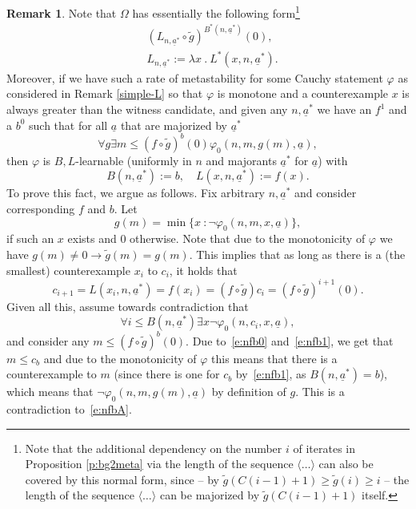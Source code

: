 \documentclass[1p]{elsarticle}
\newcommand{\be}[1][{e:\arabic{equation}}] { \begin{equation}\label{#1} }
\newcommand{\ee} { \end{equation} }
\newcommand{\tup}{\underline} %
\theoremstyle{plain}
\theoremstyle{definition}
\newtheorem{rmk}[thm]{Remark}
\theoremstyle{remark}
\renewcommand{\phi}{\varphi}
\theoremstyle{definition}
\begin{document}
{\begin{rmk}\label{r:metastr}
Note that $\Omega$ has essentially the following form\footnote{Note that 
the additional dependency on the number $i$ of iterates in 
Proposition \ref{p:bg2meta} via the length of the sequence 
$\langle \ldots\rangle$ can also 
be covered by 
this normal form, since -- by $\tilde{g}(C(i-1)+1)\ge\tilde{g}(i)\ge i$ -- 
the length of the sequence $\langle\ldots\rangle$  can be majorized by 
$\tilde{g}(C(i-1)+1)$ itself.}
\begin{align*}
&(L_{n,\tup a^*}\circ \tilde{g})^{B^*(n,\tup a^*)}(0),\\
&L_{n,\tup a^*}:=\lambda x\ .\ L^*(x,n,\tup a^*).
\end{align*}
Moreover, if we have such a rate of metastability for some Cauchy statement 
$\varphi$ as considered in Remark \ref{simple-L} so that 
$\varphi$ is monotone and a counterexample $x$ is always greater than the 
witness candidate, and given any $n,\tup a^*$ we have an 
$f^1$ and a $b^0$ such that for all $\underline{a}$ 
that are majorized by $\underline{a}^*$ 
\be[e:nfbA]
\forall g \exists m \leq (f\circ \tilde{g})^b(0) \phi_0(n,m,g(m),\tup a),
\ee
then $\phi$ is $B,L$-learnable (uniformly in $n$ and majorants 
$\underline{a}^*$ for $\underline{a}$) with
\[
B(n,\tup a^*):=b,\quad L(x,n,\tup a^*):=f(x).
\]
To prove this fact, we argue as follows. Fix arbitrary $n,\tup a^*$ and
consider corresponding $f$ and $b$. Let
\[
g(m)=\min\{x\ : \neg\phi_0(n,m,x,\tup a) \},
\]
if such an $x$ exists and $0$ otherwise. Note that due to the monotonicity
of $\phi$ we have $g(m)\neq0\rightarrow \tilde g(m)=g(m)$. This implies that
as long as there is a (the smallest) counterexample $x_i$ to $c_i$, it holds that
\be[e:nfb0]
c_{i+1}=L(x_i,n,\tup a^*)=f(x_i)
=(f\circ \tilde g)c_i=(f\circ \tilde g)^{i+1}(0).
\ee
Given all this, assume towards contradiction that
\be[e:nfb1]
\forall i\leq B(n,\tup a^*) \exists x \neg\phi_0(n,c_i,x,\tup a),
\ee
and consider any $m\leq (f\circ \tilde{g})^b(0)$. Due to~\eqref{e:nfb0} and~\eqref{e:nfb1},
we get that $m\leq c_b$ and due to the monotonicity of $\phi$ this means that
there is a counterexample to $m$ (since there is one for $c_b$ by~\eqref{e:nfb1}, as $B(n,\tup a^*)=b$), which 
means that $\neg\phi_0(n,m,g(m),\tup a)$ by definition of $g$. This is a contradiction
to~\eqref{e:nfbA}.
\end{rmk}

}
\end{document}
